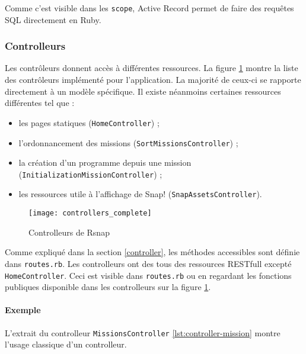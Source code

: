 Comme c'est visible dans les \texttt{scope}, Active Record permet de faire des requêtes SQL directement en Ruby. 


\subsubsection{Controlleurs}
Les contrôleurs donnent accès à différentes ressources. La figure \ref{fig:controllers} montre la liste des contrôleurs implémenté pour l'application. La majorité de ceux-ci se rapporte directement à un modèle spécifique. Il existe néanmoins certaines ressources différentes tel que : 
\begin{itemize}
  \item les pages statiques (\texttt{HomeController}) ;
  \item l'ordonnancement des missions (\texttt{SortMissionsController}) ; 
  \item la création d'un programme depuis une mission (\texttt{InitializationMissionController}) ;
  \item les ressources utile à l'affichage de Snap! (\texttt{SnapAssetsController}).
\end{itemize}
\begin{figure}
  \begin{center}
    \texttt{[image: controllers\_complete]}
    \caption{Controlleurs de Rsnap}
    \label{fig:controllers}
  \end{center}
\end{figure}

Comme expliqué dans la section \ref{controller}, les méthodes accessibles sont définie dans \texttt{routes.rb}. Les controlleurs ont des tous des ressources RESTfull excepté \texttt{HomeController}. Ceci est visible dans \texttt{routes.rb} ou en regardant les fonctions publiques disponible dans les controlleurs sur la figure \ref{fig:controllers}.

\paragraph{Exemple}
L'extrait du controlleur \texttt{MissionsController} \ref{lst:controller-mission} montre l'usage classique d'un controlleur. 



